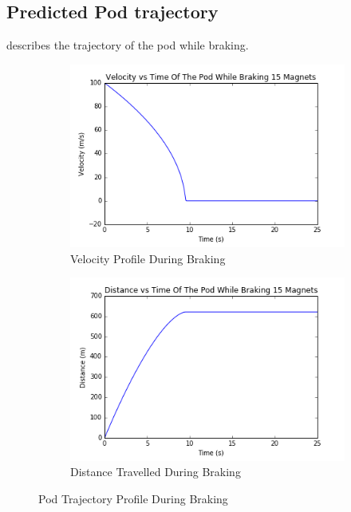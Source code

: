 \documentclass[main.tex]{subfiles}
\begin{document}
\begin{flushleft}
\subsection{Predicted Pod trajectory}
 describes the trajectory of the pod while braking.\\
\begin{figure}
	\centering
	\begin{subfigure}{0.4\textwidth}
        \includegraphics[width=\linewidth]{images/velocity_time_graph}
        \caption{Velocity Profile During Braking}
        \label{fig:velocity-profile}
    \end{subfigure}
    \begin{subfigure}{0.4\textwidth}
        \includegraphics[width=\linewidth]{images/distance_time_graph}
        \caption{Distance Travelled During Braking}
        \label{fig:distance-profile}
    \end{subfigure}
    \caption{Pod Trajectory Profile During Braking}
    \label{fig:pod-trajectory-profile}
\end{figure}

\end{flushleft}
\end{document}
